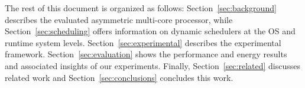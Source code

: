 The rest of this document is organized as follows: Section~\ref{sec:background} describes the 
evaluated asymmetric multi-core processor, while Section~\ref{sec:scheduling} offers information on 
dynamic schedulers at the OS and runtime system levels. Section~\ref{sec:experimental} 
describes the experimental framework. Section~\ref{sec:evaluation} shows the performance 
and energy results and associated insights of our experiments. Finally, 
Section~\ref{sec:related} discusses related work and Section~\ref{sec:conclusions} concludes 
this work. 
\fi
%  
